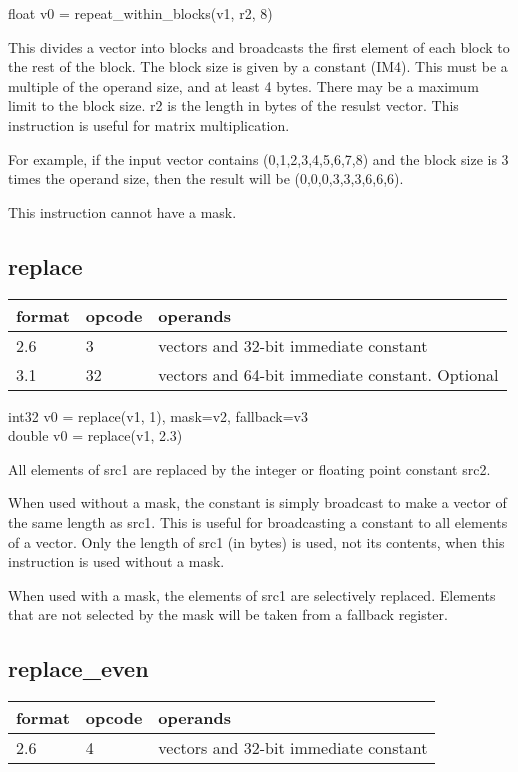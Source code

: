 \documentclass[forwardcom.tex]{subfiles}
\begin{document}
float v0 = repeat\_within\_blocks(v1, r2, 8) 
\vv

This divides a vector into blocks and broadcasts the first element of each block to the rest of the block. The block size is given by a constant (IM4). This must be a multiple of the operand size, and at least 4 bytes. There may be a maximum limit to the block size. r2 is the length in bytes of the resulst vector. This instruction is useful for matrix multiplication.
\vv

For example, if the input vector contains (0,1,2,3,4,5,6,7,8) and the block size is 3 times the operand size, then the result will be (0,0,0,3,3,3,6,6,6).
\vv

This instruction cannot have a mask.
\vv

\subsection{replace}
\label{table:replaceInstruction}
\begin{tabular}{|p{12mm}|p{15mm}|p{100mm}|}
\hline
\bfseries format & \bfseries opcode & \bfseries operands \\ \hline
2.6 & 3 & vectors and 32-bit immediate constant \\ \hline
3.1 & 32 & vectors and 64-bit immediate constant. Optional \\ \hline
\end{tabular}
\vv

int32 v0 = replace(v1, 1), mask=v2, fallback=v3\\
double v0 = replace(v1, 2.3)
\vv

All elements of src1 are replaced by the integer or floating point constant src2.
\vv

When used without a mask, the constant is simply broadcast to make a vector of the same length as src1. This is useful for broadcasting a constant to all elements of a vector. Only the length of src1 (in bytes) is used, not its contents, when this instruction is used without a mask.
\vv

When used with a mask, the elements of src1 are selectively replaced. Elements that are not selected by the mask will be taken from a fallback register.
\vv

\subsection{replace\_even}
\label{table:replaceEvenInstruction}
\begin{tabular}{|p{12mm}|p{15mm}|p{100mm}|}
\hline
\bfseries format & \bfseries opcode & \bfseries operands \\ \hline
2.6 & 4 & vectors and 32-bit immediate constant \\ \hline
\end{tabular}
\vv
\end{document}
